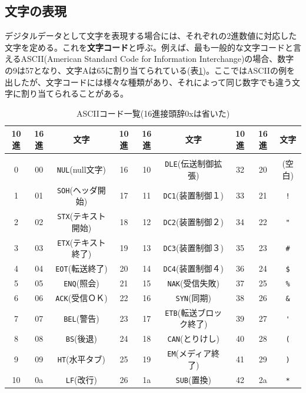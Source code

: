 \subsection{文字の表現}
デジタルデータとして文字を表現する場合には、それぞれの2進数値に対応した文字を定める。これを\textbf{文字コード}と呼ぶ。例えば、最も一般的な文字コードと言えるASCII(American Standard Code for Information Interchange)の場合、数字の9は57となり、文字Aは65に割り当てられている(表\ref{table1_2})。ここではASCIIの例を出したが、文字コードには様々な種類があり、それによって同じ数字でも違う文字に割り当てられることがある。
\begin{table}
\centering
\caption{ASCIIコード一覧(16進接頭辞0xは省いた)}\label{table1_2}
\begin{tabular}{|c|c|c||c|c|c||c|c|c|}\hline
10進&16進&文字&10進&16進&文字&10進&16進&文字 \\ \hline
 & & &&&& & & \\[-15pt] \hline
0&00&\verb|NUL|{\scriptsize (null文字)}&16&10&\verb|DLE|{\scriptsize (伝送制御拡張)}&32&20&(空白)\\ \hline
1&01&\verb|SOH|{\scriptsize (ヘッダ開始)}&17&11&\verb|DC1|{\scriptsize (装置制御１)}&33&21&\verb|!|\\ \hline
2&02&\verb|STX|{\scriptsize (テキスト開始)}&18&12&\verb|DC2|{\scriptsize (装置制御２)}&34&22&\verb|"|\\ \hline
3&03&\verb|ETX|{\scriptsize (テキスト終了)}&19&13&\verb|DC3|{\scriptsize (装置制御３)}&35&23&\verb|#|\\ \hline
4&04&\verb|EOT|{\scriptsize (転送終了)}&20&14&\verb|DC4|{\scriptsize (装置制御４)}&36&24&\verb|$|\\ \hline
5&05&\verb|ENQ|{\scriptsize (照会)}&21&15&\verb|NAK|{\scriptsize (受信失敗)}&37&25&\verb|%|\\ \hline
6&06&\verb|ACK|{\scriptsize (受信ＯＫ)}&22&16&\verb|SYN|{\scriptsize (同期)}&38&26&\verb|&|\\ \hline
7&07&\verb|BEL|{\scriptsize (警告)}&23&17&\verb|ETB|{\scriptsize (転送ブロック終了)}&39&27&\verb|'|\\ \hline
8&08&\verb|BS|{\scriptsize (後退)}&24&18&\verb|CAN|{\scriptsize (とりけし)}&40&28&\verb|(|\\ \hline
9&09&\verb|HT|{\scriptsize (水平タブ)}&25&19&\verb|EM|{\scriptsize (メディア終了)}&41&29&\verb|)|\\ \hline
10&0a&\verb|LF|{\scriptsize (改行)}&26&1a&\verb|SUB|{\scriptsize (置換)}&42&2a&\verb|*|\\ \hline

\end{tabular}
\end{table}

